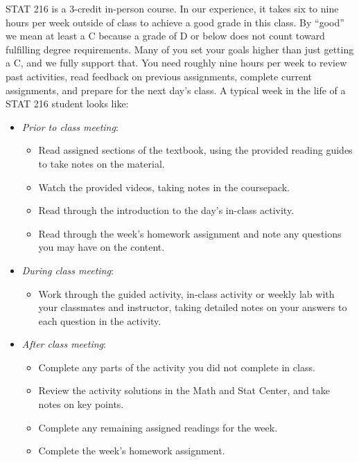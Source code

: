 \documentclass[
]{report}
\providecommand{\tightlist}{%
  \setlength{\itemsep}{0pt}\setlength{\parskip}{0pt}}
\begin{document}
STAT 216 is a 3-credit in-person course. In our experience, it takes six to nine hours per week outside of class to achieve a good grade in this class. By ``good'' we mean at least a C because a grade of D or below does not count toward fulfilling degree requirements. Many of you set your goals higher than just getting a C, and we fully support that. You need roughly nine hours per week to review past activities, read feedback on previous assignments, complete current assignments, and prepare for the next day's class. A typical week in the life of a STAT 216 student looks like:

\begin{itemize}
\tightlist
\item
  \emph{Prior to class meeting}:

  \begin{itemize}
  \tightlist
  \item
    Read assigned sections of the textbook, using the provided reading guides to take notes on the material.
  \item
    Watch the provided videos, taking notes in the coursepack.
  \item
    Read through the introduction to the day's in-class activity.
  \item
    Read through the week's homework assignment and note any questions you may have on the content.
  \end{itemize}
\item
  \emph{During class meeting}:

  \begin{itemize}
  \tightlist
  \item
    Work through the guided activity, in-class activity or weekly lab with your classmates and instructor, taking detailed notes on your answers to each question in the activity.
  \end{itemize}
\item
  \emph{After class meeting}:

  \begin{itemize}
  \tightlist
  \item
    Complete any parts of the activity you did not complete in class.
  \item
    Review the activity solutions in the Math and Stat Center, and take notes on key points.
  \item
    Complete any remaining assigned readings for the week.
  \item
    Complete the week's homework assignment.
  \end{itemize}
\end{itemize}
\end{document}
